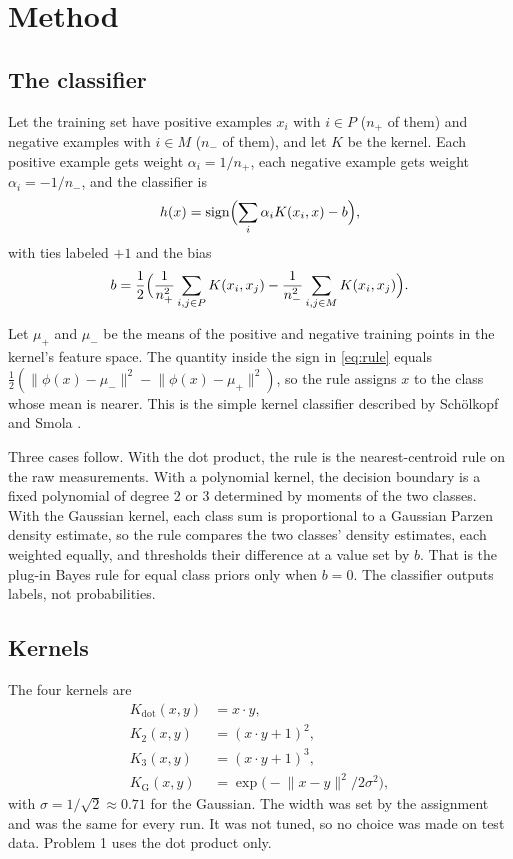 \section{Method}

\subsection{The classifier}

Let the training set have positive examples $x_i$ with $i \in P$ ($n_+$ of them) and negative examples with $i \in M$ ($n_-$ of them), and let $K$ be the kernel. Each positive example gets weight $\alpha_i = 1/n_+$, each negative example gets weight $\alpha_i = -1/n_-$, and the classifier is
\begin{equation}
h(x) = \operatorname{sign}\Bigl(\sum_i \alpha_i K(x_i, x) - b\Bigr), \label{eq:rule}
\end{equation}
with ties labeled $+1$ and the bias
\begin{equation}
b = \frac{1}{2}\Bigl(\frac{1}{n_+^2}\sum_{i,j \in P} K(x_i, x_j) - \frac{1}{n_-^2}\sum_{i,j \in M} K(x_i, x_j)\Bigr). \label{eq:bias}
\end{equation}

Let $\mu_+$ and $\mu_-$ be the means of the positive and negative training points in the kernel's feature space. The quantity inside the sign in \eqref{eq:rule} equals $\tfrac{1}{2}(\lVert\phi(x)-\mu_-\rVert^2 - \lVert\phi(x)-\mu_+\rVert^2)$, so the rule assigns $x$ to the class whose mean is nearer. This is the simple kernel classifier described by Sch\"olkopf and Smola \cite[Sec.~1.2]{scholkopf2002}.

Three cases follow. With the dot product, the rule is the nearest-centroid rule on the raw measurements. With a polynomial kernel, the decision boundary is a fixed polynomial of degree 2 or 3 determined by moments of the two classes. With the Gaussian kernel, each class sum is proportional to a Gaussian Parzen density estimate, so the rule compares the two classes' density estimates, each weighted equally, and thresholds their difference at a value set by $b$. That is the plug-in Bayes rule for equal class priors only when $b = 0$. The classifier outputs labels, not probabilities.

\subsection{Kernels}

The four kernels are
\begin{align}
K_{\mathrm{dot}}(x, y) &= x \cdot y, \nonumber\\
K_{2}(x, y) &= (x \cdot y + 1)^2, \nonumber\\
K_{3}(x, y) &= (x \cdot y + 1)^3, \nonumber\\
K_{\mathrm{G}}(x, y) &= \exp\bigl(-\lVert x - y\rVert^2 / 2\sigma^2\bigr), \label{eq:kernels}
\end{align}
with $\sigma = 1/\sqrt{2} \approx 0.71$ for the Gaussian. The width was set by the assignment and was the same for every run. It was not tuned, so no choice was made on test data. Problem 1 uses the dot product only.


